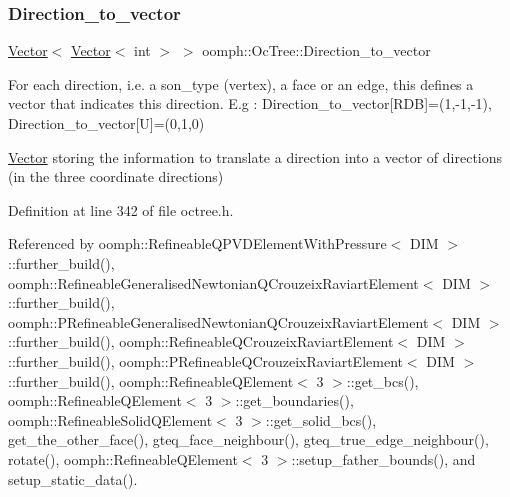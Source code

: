 \mbox{\label{classoomph_1_1OcTree_adf813fbb9cffe89fb51f3c8ccd3083ca}} 
\subsubsection{\texorpdfstring{Direction\+\_\+to\+\_\+vector}{Direction\_to\_vector}}
{\footnotesize\ttfamily \hyperlink{classoomph_1_1Vector}{Vector}$<$ \hyperlink{classoomph_1_1Vector}{Vector}$<$ int $>$ $>$ oomph\+::\+Oc\+Tree\+::\+Direction\+\_\+to\+\_\+vector\hspace{0.3cm}{\ttfamily [static]}}



For each direction, i.\+e. a son\+\_\+type (vertex), a face or an edge, this defines a vector that indicates this direction. E.\+g \+: Direction\+\_\+to\+\_\+vector\mbox{[}R\+DB\mbox{]}=(1,-\/1,-\/1), Direction\+\_\+to\+\_\+vector\mbox{[}U\mbox{]}=(0,1,0) 

\hyperlink{classoomph_1_1Vector}{Vector} storing the information to translate a direction into a vector of directions (in the three coordinate directions) 

Definition at line 342 of file octree.\+h.



Referenced by oomph\+::\+Refineable\+Q\+P\+V\+D\+Element\+With\+Pressure$<$ D\+I\+M $>$\+::further\+\_\+build(), oomph\+::\+Refineable\+Generalised\+Newtonian\+Q\+Crouzeix\+Raviart\+Element$<$ D\+I\+M $>$\+::further\+\_\+build(), oomph\+::\+P\+Refineable\+Generalised\+Newtonian\+Q\+Crouzeix\+Raviart\+Element$<$ D\+I\+M $>$\+::further\+\_\+build(), oomph\+::\+Refineable\+Q\+Crouzeix\+Raviart\+Element$<$ D\+I\+M $>$\+::further\+\_\+build(), oomph\+::\+P\+Refineable\+Q\+Crouzeix\+Raviart\+Element$<$ D\+I\+M $>$\+::further\+\_\+build(), oomph\+::\+Refineable\+Q\+Element$<$ 3 $>$\+::get\+\_\+bcs(), oomph\+::\+Refineable\+Q\+Element$<$ 3 $>$\+::get\+\_\+boundaries(), oomph\+::\+Refineable\+Solid\+Q\+Element$<$ 3 $>$\+::get\+\_\+solid\+\_\+bcs(), get\+\_\+the\+\_\+other\+\_\+face(), gteq\+\_\+face\+\_\+neighbour(), gteq\+\_\+true\+\_\+edge\+\_\+neighbour(), rotate(), oomph\+::\+Refineable\+Q\+Element$<$ 3 $>$\+::setup\+\_\+father\+\_\+bounds(), and setup\+\_\+static\+\_\+data().

\mbox{\label{classoomph_1_1OcTree_a24e29b9da2bf17cc81d803af6925890b}} 
